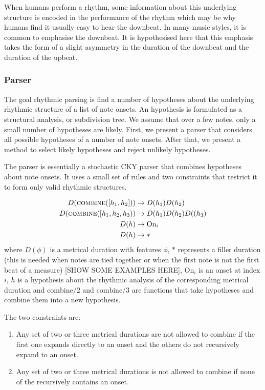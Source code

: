 When humans perform a rhythm, some information about this underlying structure is encoded in the performance of the rhythm which may be why humans find it usually easy to hear the downbeat. In many music styles, it is common to emphasise the downbeat. It is hypothesised here that this emphasis takes the form of a slight asymmetry in the duration of the downbeat and the duration of the upbeat.

\subsubsection*{Parser}

The goal rhythmic parsing is find a number of hypotheses about the underlying rhythmic structure of a list of note onsets. An hypothesis is formulated as a structural analysis, or subdivision tree. We assume that over a few notes, only a small number of hypotheses are likely. First, we present a parser that considers all possible hypotheses of a number of note onsets. After that, we present a method to select likely hypotheses and reject unlikely hypotheses. 

The parser is essentially a stochastic CKY parser that combines hypotheses about note onsets. It uses a small set of rules and two constraints that restrict it to form only valid rhythmic structures. 

\begin{align*}
\label{eq:rules}
D(\textsc{combine}([h_1, h_2])) &\rightarrow D(h_1) D(h_2)\\
D(\textsc{combine}([h_1, h_2, h_3)) &\rightarrow D(h_1) D(h_2) D((h_3)\\
D(h) &\rightarrow \textrm{On}_i\\
D(h) &\rightarrow *
\end{align*}
where $D(\phi)$ is a metrical duration with features $\phi$, $*$ represents a filler duration (this is needed when notes are tied together or when the first note is not the first beat of a measure) [SHOW SOME EXAMPLES HERE], $\textrm{On}_i$ is an onset at index $i$, $h$ is a hypothesis about the rhythmic analysis of the corresponding metrical duration and $\textrm{combine}/2$ and $\textrm{combine}/3$ are functions that take hypotheses and combine them into a new hypothesis.

The two constraints are:
\begin{enumerate}
\item Any set of two or three metrical durations are not allowed to combine if the first one expands directly to an onset and the others do not recursively expand to an onset.
\item Any set of two or three metrical durations is not allowed to combine if none of the recursively contains an onset.
\end{enumerate}

